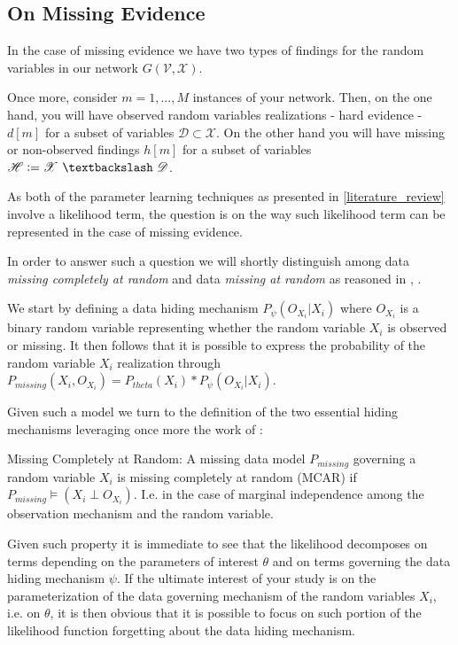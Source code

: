 \documentclass[11pt]{article}
\begin{document}
\begin{article}
\newpage


\section{On Missing Evidence}
\label{missing-learning}
In the case of missing evidence we have two types of findings for
the random variables in our network \(G(\mathscr{V}, \mathscr{X})\).

Once more, consider \(m = 1, ..., M\) instances of your network. Then,
on the one hand, you will have observed random variables
realizations - hard evidence - \(d[m]\) for a subset of variables
\(\mathscr{D} \subset \mathscr{X}\). On the other hand you will have
missing or non-observed findings \(h[m]\) for a subset of variables
\(\mathscr{H} \vcentcolon= \mathscr{X} \ \textbackslash \ \mathscr{D}\).

As both of the parameter learning techniques as presented in
\ref{literature_review} involve a likelihood term, the question is on
the way such likelihood term can be represented in the case of
missing evidence.

In order to answer such a question we will shortly distinguish among
data \emph{missing completely at random} and data \emph{missing at random} as
reasoned in \cite{little1976inference}, \cite{rubin1976inference}.

We start by defining a data hiding mechanism \(P_\psi(O_{X_i}|X_i)\) where
\(O_{X_i}\) is a binary random variable representing whether the
random variable \(X_i\) is observed or missing. It then follows that
it is possible to express the probability of the random variable
\(X_i\) realization through \(P_{missing}(X_i, O_{X_i}) = P_{theta}(X_i) *
  P_\psi(O_{X_i}|X_i)\).

Given such a model we turn to the definition of the two essential
hiding mechanisms leveraging once more the work of \cite{koller2009probabilistic}:

\begin{definition}
Missing Completely at Random: A missing data model $P_{missing}$ governing a
random variable $X_i$ is missing
completely at random (MCAR) if $P_{missing} \models (X_i \perp O_{X_i})$.
I.e. in the case of marginal independence among the observation mechanism
and the random variable.
\end{definition}  

Given such property it is immediate to see that the likelihood
decomposes on terms depending on the parameters of interest \(\theta\)
and on terms governing the data hiding mechanism \(\psi\). If the
ultimate interest of your study is on the parameterization of the
data governing mechanism of the random variables \(X_i\), i.e. on
\(\theta\), it is then obvious that it is possible to focus on such
portion of the likelihood function forgetting about the data hiding
mechanism.


\end{article}
\end{document}
